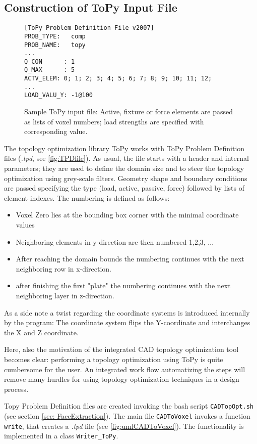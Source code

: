 \subsection{Construction of ToPy Input File}
\label{sec: ToPyInputConstruction}
\begin{figure}
\begin{lstlisting}
[ToPy Problem Definition File v2007]
PROB_TYPE:   comp
PROB_NAME:   topy
...
Q_CON      : 1
Q_MAX      : 5
ACTV_ELEM: 0; 1; 2; 3; 4; 5; 6; 7; 8; 9; 10; 11; 12; 
...
LOAD_VALU_Y: -1@100
\end{lstlisting}
\caption{Sample ToPy input file: Active, fixture or force elements are passed as lists of voxel numbers; load strengths are specified with corresponding value.}
\label{fig:TPDfile}
\end{figure}
The topology optimization library ToPy works with ToPy Problem Definition files ({\it.tpd}, see \autoref{fig:TPDfile}). As usual, the file starts with a header and internal parameters; they are used to define the domain size and to steer the topology optimization using grey-scale filters. Geometry shape and boundary conditions are passed specifying the type (load, active, passive, force) followed by lists of element indexes. The numbering is defined as follows:
\begin{itemize}
\item Voxel Zero lies at the bounding box corner with the minimal coordinate values
\item Neighboring elements in y-direction are then numbered 1,2,3, ...
\item After reaching the domain bounds the numbering continues with the next neighboring row in x-direction.
\item after finishing the first "plate" the numbering continues with the next neighboring layer in z-direction.
\end{itemize}
As a side note a twist regarding the coordinate systems is introduced internally by the program: The coordinate system flips the Y-coordinate and interchanges the X and Z coordinate. 

Here, also the motivation of the integrated CAD topology optimization tool becomes clear: performing a topology optimization using ToPy is quite cumbersome for the user. An integrated work flow automatizing the steps will remove many hurdles for using topology optimization techniques in a design process.  

Topy Problem Definition files are created invoking the bash script \lstinline|CADTopOpt.sh| (see section \ref{sec: FaceExtraction}). The main file \lstinline|CADToVoxel| invokes a function \lstinline|write|, that creates a {\it.tpd} file (see \autoref{fig:umlCADToVoxel}). The functionality is implemented in a class \lstinline|Writer_ToPy|.

